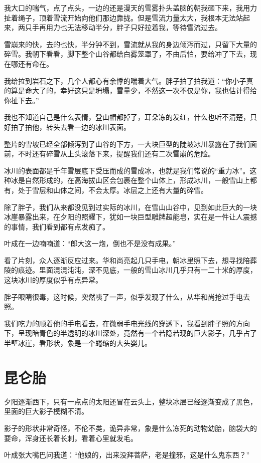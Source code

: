 我大口的喘气，点了点头，一边的还是漫天的雪雾扑头盖脑的朝我砸下来，我用力扯着绳子，顶着雪流开始向他们那边靠拢。但是雪流力量太大，我根本无法站起来，两只手再用力也无法移动半分，胖子只好拉着我，等待雪流过去。

雪崩来的快，去的也快，半分钟不到，雪流就从我的身边倾泻而过，只留下大量的碎雪。我朝下看看，脚下整个山谷都给白雾笼罩了，不由后怕，要给冲了下去，现在哪还有命在。

我给拉到岩石之下，几个人都心有余悸的喘着大气。胖子拍了拍我道：“你小子真的算是命大了的，幸好这只是坍塌，雪量少，不然这一次不仅是你，我也估计得给你扯下去。”

我也不知道自己是什么表情，登山帽都掉了，耳朵冻的发红，什么也听不清楚，只好拍了拍他，转头去看一边的冰川表面。

整片的雪坡已经全部倾泻到了山谷的下方，一大块巨型的陡坡冰川暴露在了我们面前，不时还有碎雪从上头滚落下来，提醒我们还有二次雪崩的危险。

冰川的表面都是千年雪层底下受压而成的雪成冰，也就是我们常说的“重力冰”。这种冰是自然形成的，在高海拔山区会包裹在整个山体上，形成冰川，一般雪山上都有，处于雪层和山体之间，不会太厚。冰层之上还有大量的碎雪。

除了胖子，我们从来都没见到过实际的冰川，在雪山山谷中，见到如此巨大的一块冰崖暴露出来，在夕阳的照耀下，犹如一块巨型雕牌超能皂，实在是一件让人震撼的事情，我们看到都有点发痴了。

叶成在一边喃喃道：“郎大这一炮，倒也不是没有成果。”

看了片刻，众人逐渐反应过来。华和尚亮起几只手电，朝冰里照下去，想寻找陪葬陵的痕迹。里面混混沌沌，深不见底，一般的雪山冰川几乎只有一二十米的厚度，这块冰川的厚度似乎有点异常。

胖子眼睛很毒，这时候，突然咦了一声，似乎发现了什么，从华和尚抢过手电去照。

我们吃力的顺着他的手电看去，在微弱手电光线的穿透下，我看到胖子照的方向下，呈现暗青色的半透明的冰川深处，竟然有一个若隐若现的巨大影子，几乎占了半壁冰崖，看形状，象是一个蜷缩的大头婴儿。

\chapter{昆仑胎}

夕阳逐渐西下，只有一点点的太阳还冒在云头上，整块冰层已经逐渐变成了黑色，里面的巨大影子模糊不清。

影子的形状非常奇怪，不伦不类，诡异非常，象是什么冻死的动物幼胎，脑袋大的要命，浑身还长着长刺，看着心里就发毛。

叶成张大嘴巴问我道：“他娘的，出来没拜菩萨，老是撞邪，这是什么鬼东西？”

